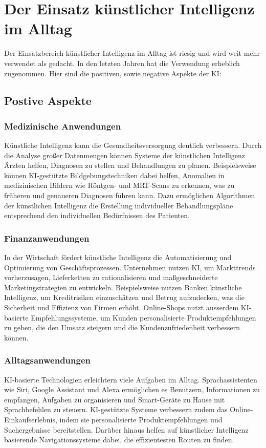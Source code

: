 \chapter{Der Einsatz künstlicher Intelligenz im Alltag} 
Der Einsatzbereich künstlicher Intelligenz im Alltag ist riesig und wird weit mehr verwendet als gedacht. In den letzten Jahren hat die Verwendung erheblich zugenommen. Hier sind die positiven, sowie negative Aspekte der KI:
\section{Postive Aspekte}
\subsection{Medizinische Anwendungen}
Künstliche Intelligenz kann die Gesundheitsversorgung deutlich verbessern. Durch die Analyse großer Datenmengen können Systeme der künstlichen Intelligenz Ärzten helfen, Diagnosen zu stellen und Behandlungen zu planen. Beispielsweise können KI-gestützte Bildgebungstechniken dabei helfen, Anomalien in medizinischen Bildern wie Röntgen- und MRT-Scans zu erkennen, was zu früheren und genaueren Diagnosen führen kann. Dazu ermöglichen Algorithmen der künstlichen Intelligenz die Erstellung individueller Behandlungspläne entsprechend den individuellen Bedürfnissen des Patienten.
\subsection{Finanzanwendungen}
In der Wirtschaft fördert künstliche Intelligenz die Automatisierung und Optimierung von Geschäftsprozessen. Unternehmen nutzen KI, um Markttrends vorherzusagen, Lieferketten zu rationalisieren und maßgeschneiderte Marketingstrategien zu entwickeln. Beispielsweise nutzen Banken künstliche Intelligenz, um Kreditrisiken einzuschätzen und Betrug aufzudecken, was die Sicherheit und Effizienz von Firmen erhöht. Online-Shops nutzt ausserdem KI-basierte Empfehlungssysteme, um Kunden personalisierte Produktempfehlungen zu geben, die den Umsatz steigern und die Kundenzufriedenheit verbessern können.
\subsection{Alltagsanwendungen}
KI-basierte Technologien erleichtern viele Aufgaben im Alltag. Sprachassistenten wie Siri, Google Assistant und Alexa ermöglichen es Benutzern, Informationen zu empfangen, Aufgaben zu organisieren und Smart-Geräte zu Hause mit Sprachbefehlen zu steuern. KI-gestützte Systeme verbessern zudem das Online-Einkaufserlebnis, indem sie personalisierte Produktempfehlungen und Suchergebnisse bereitstellen. Darüber hinaus helfen auf künstlicher Intelligenz basierende Navigationssysteme dabei, die effizientesten Routen zu finden.
